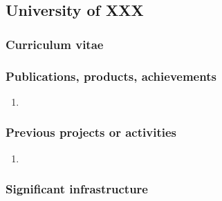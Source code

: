 \subsection*{University of XXX}

%

\subsubsection*{Curriculum vitae}


%
%
%

\subsubsection*{Publications, products, achievements}

\begin{enumerate}
\item {}
\end{enumerate}

\subsubsection*{Previous projects or activities}

\begin{enumerate}
\item {}
\end{enumerate}

\subsubsection*{Significant infrastructure}

